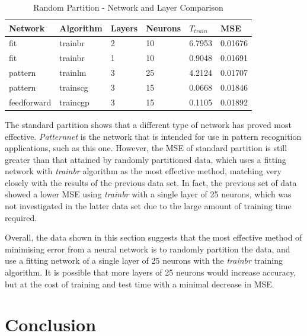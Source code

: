 \documentclass[a4paper, 10pt, conference]{ieeeconf}
\begin{document}
\begin{table}
\centering
\caption{Random Partition - Network and Layer Comparison}
\label{tbl:mixed_networks}
\begin{tabular}{llllll}
\hline
\textbf{Network} & \textbf{Algorithm} & \textbf{Layers} & \textbf{Neurons} & \textbf{$T_{train}$} & \textbf{MSE} \\ \hline
fit & trainbr & 2 & 10 & 6.7953 & 0.01676 \\ \hline
fit & trainbr & 1 & 10 & 0.9048 & 0.01691 \\ \hline
pattern & trainlm & 3 & 25 & 4.2124 & 0.01707 \\ \hline
pattern & trainscg & 3 & 15 & 0.0668& 0.01846 \\ \hline
feedforward & traincgp & 3 & 15 & 0.1105 & 0.01892 \\ \hline
\end{tabular}
\end{table}

The standard partition shows that a different type of network has proved most effective. \textit{Patternnet} is the network that is intended for use in pattern recognition applications, such as this one. However, the MSE of standard partition is still greater than that attained by randomly partitioned data, which uses a fitting network with \textit{trainbr} algorithm as the most effective method, matching very closely with the results of the previous data set. In fact, the previous set of data showed a lower MSE using \textit{trainbr} with a single layer of 25 neurons, which was not investigated in the latter data set due to the large amount of training time required. 

Overall, the data shown in this section suggests that the most effective method of minimising error from a neural network is to randomly partition the data, and use a fitting network of a single layer of 25 neurons with the \textit{trainbr} training algorithm. It is possible that more layers of 25 neurons would increase accuracy, but at the cost of training and test time with a minimal decrease in MSE.


\section{Conclusion}
\end{document}
